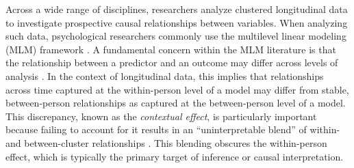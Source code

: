 


\maketitle



Across a wide range of disciplines, researchers analyze clustered longitudinal data to investigate prospective causal relationships between variables. When analyzing such data, psychological researchers commonly use the multilevel linear modeling (MLM) framework \parencite[]{bauer_fitting_2011}. A fundamental concern within the MLM literature is that the relationship between a predictor and an outcome may differ across levels of analysis \parencite[e.g.,][]{enders_centering_2007, kreft_effect_1995, raudenbush_hierarchical_2002}. In the context of longitudinal data, this implies that relationships across time captured at the within-person level of a model may differ from stable, between-person relationships as captured at the between-person level of a model. This discrepancy, known as the \textit{contextual effect}, is particularly important because failing to account for it results in an ``uninterpretable blend'' of within- and between-cluster relationships \parencite[139]{raudenbush_hierarchical_2002}. This blending obscures the within-person effect, which is typically the primary target of inference or causal interpretation.


